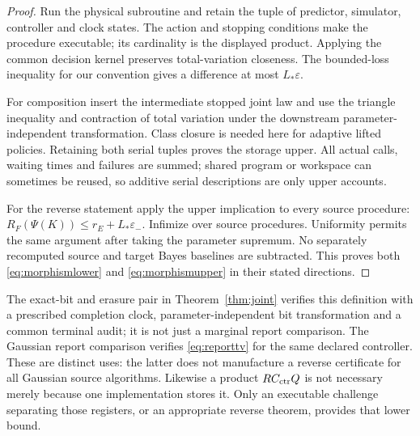 \begin{proof}
Run the physical subroutine and retain the tuple of predictor, simulator, controller and clock states. The action and stopping conditions make the procedure executable; its cardinality is the displayed product. Applying the common decision kernel preserves total-variation closeness. The bounded-loss inequality for our convention gives a difference at most $L_*\varepsilon$.

For composition insert the intermediate stopped joint law and use the triangle inequality and contraction of total variation under the downstream parameter-independent transformation. Class closure is needed here for adaptive lifted policies. Retaining both serial tuples proves the storage upper. All actual calls, waiting times and failures are summed; shared program or workspace can sometimes be reused, so additive serial descriptions are only upper accounts.

For the reverse statement apply the upper implication to every source procedure: $R_F(\Psi(K))\le r_E+L_*\varepsilon_-$. Infimize over source procedures. Uniformity permits the same argument after taking the parameter supremum. No separately recomputed source and target Bayes baselines are subtracted. This proves both \eqref{eq:morphismlower} and \eqref{eq:morphismupper} in their stated directions.
\end{proof}

The exact-bit and erasure pair in Theorem~\ref{thm:joint} verifies this definition with a prescribed completion clock, parameter-independent bit transformation and a common terminal audit; it is not just a marginal report comparison. The Gaussian report comparison verifies \eqref{eq:reporttv} for the same declared controller. These are distinct uses: the latter does not manufacture a reverse certificate for all Gaussian source algorithms. Likewise a product $RC_{\rm ctr}Q$ is not necessary merely because one implementation stores it. Only an executable challenge separating those registers, or an appropriate reverse theorem, provides that lower bound.
